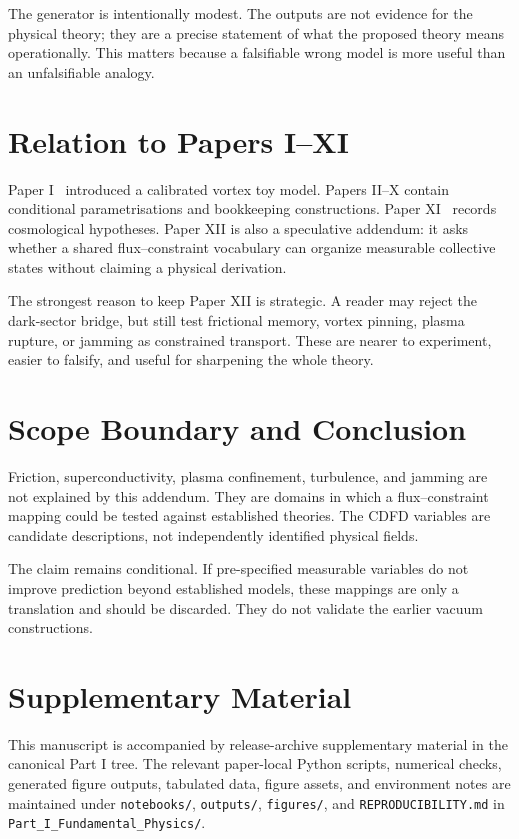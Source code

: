 \documentclass[11pt]{article}
\begin{document}
The generator is intentionally modest. The outputs are not evidence for the physical theory; they are a precise statement of what the proposed theory means operationally. This matters because a falsifiable wrong model is more useful than an unfalsifiable analogy.

\section{Relation to Papers I--XI}

Paper I~\cite{MujjabiI2026} introduced a calibrated vortex toy model. Papers II--X contain conditional parametrisations and bookkeeping constructions. Paper XI~\cite{MujjabiXI2026} records cosmological hypotheses. Paper XII is also a speculative addendum: it asks whether a shared flux--constraint vocabulary can organize measurable collective states without claiming a physical derivation.

The strongest reason to keep Paper XII is strategic. A reader may reject the dark-sector bridge, but still test frictional memory, vortex pinning, plasma rupture, or jamming as constrained transport. These are nearer to experiment, easier to falsify, and useful for sharpening the whole theory.

\section{Scope Boundary and Conclusion}

Friction, superconductivity, plasma confinement, turbulence, and jamming are
not explained by this addendum. They are domains in which a flux--constraint
mapping could be tested against established theories. The CDFD variables are
candidate descriptions, not independently identified physical fields.

The claim remains conditional. If pre-specified measurable variables do not
improve prediction beyond established models, these mappings are only a
translation and should be discarded. They do not validate the earlier vacuum
constructions.

\section*{Supplementary Material}

This manuscript is accompanied by release-archive supplementary material in
the canonical Part I tree. The relevant paper-local Python scripts, numerical checks, generated figure outputs,
tabulated data, figure assets, and environment notes are maintained under
\texttt{notebooks/}, \texttt{outputs/}, \texttt{figures/}, and
\texttt{REPRODUCIBILITY.md} in \texttt{Part\_I\_Fundamental\_Physics/}.
\end{document}
